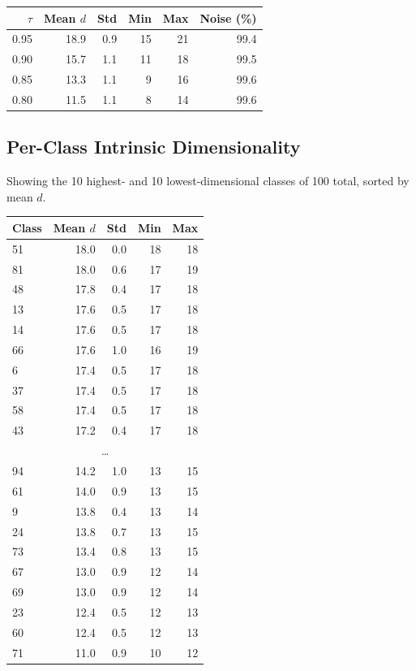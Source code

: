 \documentclass[11pt,letterpaper]{article}
\begin{document}
\begin{tabular}{@{}rrrrrr@{}}
\toprule
$\tau$ & Mean $d$ & Std & Min & Max & Noise (\%) \\
\midrule
  0.95 & 18.9 & 0.9 & 15 & 21 & 99.4 \\
  0.90 & 15.7 & 1.1 & 11 & 18 & 99.5 \\
  0.85 & 13.3 & 1.1 & 9 & 16 & 99.6 \\
  0.80 & 11.5 & 1.1 & 8 & 14 & 99.6 \\
\bottomrule
\end{tabular}

\subsection{Per-Class Intrinsic Dimensionality}

Showing the 10 highest- and 10 lowest-dimensional classes of 100 total, sorted by mean $d$.

\begin{tabular}{@{}lrrrr@{}}
\toprule
Class & Mean $d$ & Std & Min & Max \\
\midrule
  51 & 18.0 & 0.0 & 18 & 18 \\
  81 & 18.0 & 0.6 & 17 & 19 \\
  48 & 17.8 & 0.4 & 17 & 18 \\
  13 & 17.6 & 0.5 & 17 & 18 \\
  14 & 17.6 & 0.5 & 17 & 18 \\
  66 & 17.6 & 1.0 & 16 & 19 \\
  6 & 17.4 & 0.5 & 17 & 18 \\
  37 & 17.4 & 0.5 & 17 & 18 \\
  58 & 17.4 & 0.5 & 17 & 18 \\
  43 & 17.2 & 0.4 & 17 & 18 \\
  \multicolumn{5}{c}{\ldots} \\
  94 & 14.2 & 1.0 & 13 & 15 \\
  61 & 14.0 & 0.9 & 13 & 15 \\
  9 & 13.8 & 0.4 & 13 & 14 \\
  24 & 13.8 & 0.7 & 13 & 15 \\
  73 & 13.4 & 0.8 & 13 & 15 \\
  67 & 13.0 & 0.9 & 12 & 14 \\
  69 & 13.0 & 0.9 & 12 & 14 \\
  23 & 12.4 & 0.5 & 12 & 13 \\
  60 & 12.4 & 0.5 & 12 & 13 \\
  71 & 11.0 & 0.9 & 10 & 12 \\
\bottomrule
\end{tabular}
\end{document}
